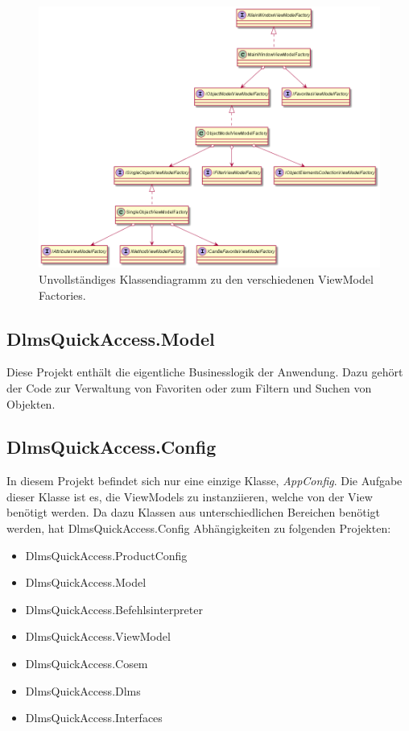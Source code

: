 \begin{figure}[H]
   \centering
   \includegraphics[width=1.0\textwidth]{gfx/vmfactories.png}
   \caption{
      Unvollständiges Klassendiagramm zu den verschiedenen ViewModel Factories.
      }
   \label{fig:vmfactories}
\end{figure}

\subsection{DlmsQuickAccess.Model}
Diese Projekt enthält die eigentliche Businesslogik der Anwendung.
Dazu gehört der Code zur Verwaltung von Favoriten oder zum Filtern und Suchen von Objekten. 

\subsection{DlmsQuickAccess.Config}\label{dqa:config}
In diesem Projekt befindet sich nur eine einzige Klasse, \textit{AppConfig}.
Die Aufgabe dieser Klasse ist es, die ViewModels zu instanziieren, welche von der View benötigt werden.
Da dazu Klassen aus unterschiedlichen Bereichen benötigt werden, hat DlmsQuickAccess.Config Abhängigkeiten zu folgenden Projekten:
\begin{itemize}
   \item DlmsQuickAccess.ProductConfig
   \item DlmsQuickAccess.Model
   \item DlmsQuickAccess.Befehlsinterpreter
   \item DlmsQuickAccess.ViewModel
   \item DlmsQuickAccess.Cosem
   \item DlmsQuickAccess.Dlms
   \item DlmsQuickAccess.Interfaces
\end{itemize}


